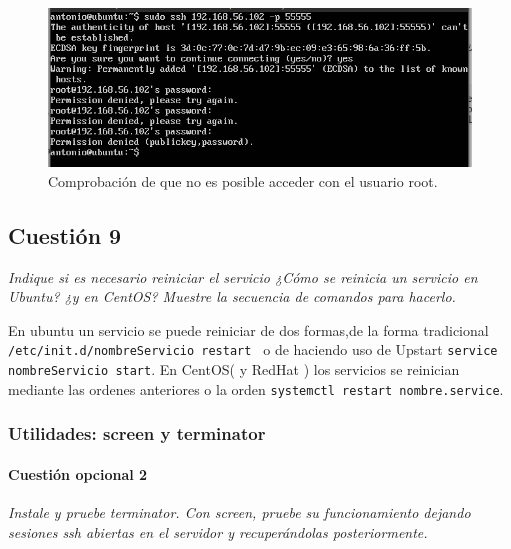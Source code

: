 \begin{figure}[H]
    \begin{center}
        \includegraphics[scale=0.6]{imagenes/img8}
        \caption{Comprobación de que no es posible acceder con el usuario root.}
        \label{fig8}
    \end{center}
\end{figure}






\subsection{Cuestión 9}
\textit{Indique si es necesario reiniciar el servicio ¿Cómo se reinicia un servicio en Ubuntu? ¿y en CentOS? Muestre la secuencia de comandos para hacerlo.}
\newline

En ubuntu un servicio se puede reiniciar de dos formas,de la forma tradicional \newline
 \texttt{ /etc/init.d/nombreServicio restart } o de haciendo uso de  Upstart \newline
 \texttt{service nombreServicio start}. \cite{rest1} En CentOS( y RedHat ) los servicios se reinician mediante las ordenes anteriores o la orden
 \texttt{systemctl restart nombre.service}. \cite{rest2}






\subsubsection{Utilidades: screen y terminator}
\paragraph{Cuestión opcional 2}
\textit{Instale y pruebe terminator. Con screen, pruebe su funcionamiento dejando sesiones ssh abiertas en el servidor y recuperándolas posteriormente.}
\newline

